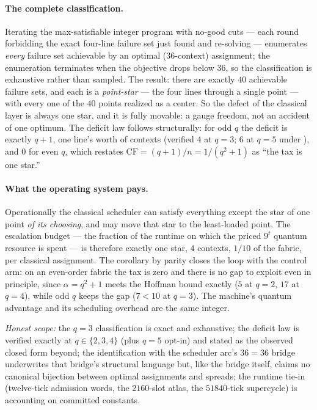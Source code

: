\documentclass[11pt]{article}
\begin{document}
\paragraph{The complete classification.}  Iterating the max-satisfiable integer
program with no-good cuts --- each round forbidding the exact four-line failure
set just found and re-solving --- enumerates \emph{every} failure set achievable
by an optimal (\(36\)-context) assignment; the enumeration terminates when the
objective drops below \(36\), so the classification is exhaustive rather than
sampled.  The result: there are exactly \(40\) achievable failure sets, and each
is a \emph{point-star} --- the four lines through a single point --- with every
one of the \(40\) points realized as a center.  So the defect of the classical
layer is always one star, and it is fully movable: a gauge freedom, not an
accident of one optimum.  The deficit law follows structurally: for odd \(q\)
the deficit is exactly \(q+1\), one line's worth of contexts (verified \(4\) at
\(q=3\); \(6\) at \(q=5\) under ), and \(0\) for even \(q\), which
restates \(\mathrm{CF}=(q+1)/n=1/(q^2+1)\) as ``the tax is one star.''

\paragraph{What the operating system pays.}  Operationally the classical
scheduler can satisfy everything except the star of one point \emph{of its
choosing}, and may move that star to the least-loaded point.  The escalation
budget --- the fraction of the runtime on which the priced \(9^t\) quantum
resource is spent --- is therefore exactly one star, \(4\) contexts, \(1/10\)
of the fabric, per classical assignment.  The corollary by parity closes the
loop with the control arm: on an even-order fabric the tax is zero and there is
no gap to exploit even in principle, since \(\alpha=q^2+1\) meets the Hoffman
bound exactly (\(5\) at \(q=2\), \(17\) at \(q=4\)), while odd \(q\) keeps the
gap (\(7<10\) at \(q=3\)).  The machine's quantum advantage and its scheduling
overhead are the same integer.

\emph{Honest scope:} the \(q=3\) classification is exact and exhaustive; the
deficit law is verified exactly at \(q\in\{2,3,4\}\) (plus \(q=5\) opt-in) and
stated as the observed closed form beyond; the identification with the
scheduler arc's \(36=36\) bridge underwrites that bridge's structural language
but, like the bridge itself, claims no canonical bijection between optimal
assignments and spreads; the runtime tie-in (twelve-tick admission words, the
\(2160\)-slot atlas, the \(51840\)-tick supercycle) is accounting on committed
constants.
\end{document}
